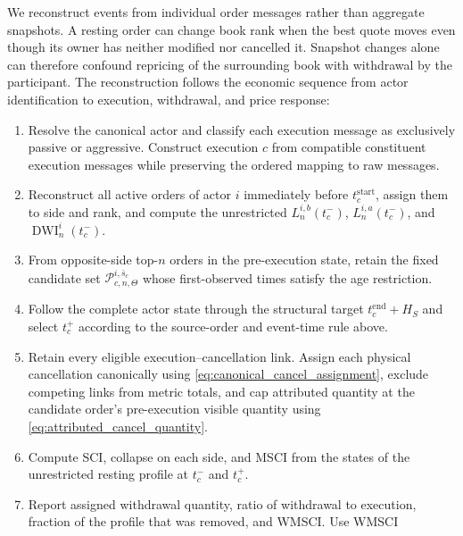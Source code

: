\documentclass[11pt]{article}
\newenvironment{review}{\begingroup\color{blue}}{\endgroup}
\begin{document}
We reconstruct events from individual order messages rather than aggregate snapshots. A resting order can change book rank
when the best quote moves even though its owner has neither modified nor cancelled it. Snapshot changes alone can therefore
confound repricing of the surrounding book with withdrawal by the participant. The reconstruction follows the economic
sequence from actor identification to execution, withdrawal, and price response:
\begin{enumerate}
    \item Resolve the canonical actor and classify each execution message as exclusively passive or aggressive. Construct execution $c$
    from compatible constituent execution messages while preserving the ordered mapping to raw messages.
    \item Reconstruct all active orders of actor $i$ immediately before $t_c^{\mathrm{start}}$, assign them to side and
    rank, and compute the unrestricted $L^{i,b}_{n}(t_c^{-})$, $L^{i,a}_{n}(t_c^{-})$, and
    $\operatorname{DWI}^{i}_{n}(t_c^{-})$.
    \item From opposite-side top-$n$ orders in the pre-execution state, retain the fixed candidate set
    $\mathcal{P}^{i,\bar{s}_c}_{c,n,\Theta}$ whose first-observed times satisfy the age restriction.
    \item Follow the complete actor state through the structural target $t_c^{\mathrm{end}}+H_S$ and select $t_c^{+}$
    according to the source-order and event-time rule above.
    \item Retain every eligible execution--cancellation link. Assign each physical cancellation canonically using
    \cref{eq:canonical_cancel_assignment}, exclude competing links from metric totals, and cap attributed quantity at the
    candidate order's pre-execution visible quantity using \cref{eq:attributed_cancel_quantity}.
    \item Compute SCI, \begin{review}collapse on each side\end{review}, and MSCI from \begin{review}the states of the unrestricted resting profile\end{review} at $t_c^{-}$ and
    $t_c^{+}$.
    \item Report assigned withdrawal quantity, \begin{review}ratio of withdrawal to execution\end{review}, \begin{review}fraction of the profile that was removed\end{review}, and WMSCI. Use WMSCI

\end{enumerate}
\end{document}
